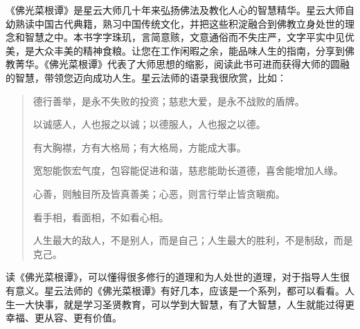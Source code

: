 \begin{book}
    《佛光菜根谭》是星云大师几十年来弘扬佛法及教化人心的智慧精华。星云大师自幼熟读中国古代典籍，熟习中国传统文化，并把这些积淀融合到佛教立身处世的理念和智慧之中。本书字字珠玑，言简意赅，文意通俗而不失庄严，文字平实中见优美，是大众丰美的精神食粮。让您在工作闲暇之余，能品味人生的指南，分享到佛教菁华。《佛光菜根谭》代表了大师思想的缩影，阅读此书可进而获得大师的圆融的智慧，带领您迈向成功人生。星云法师的语录我很欣赏，比如：\begin{quotation}
        德行善举，是永不失败的投资；慈悲大爱，是永不战败的盾牌。

        以诚感人，人也报之以诚；以德服人，人也报之以德。

        有大胸襟，方有大格局；有大格局，方能成大事。

        宽恕能恢宏气度，包容能促进和谐，慈悲能助长道德，喜舍能增加人缘。

        心善，则触目所及皆真善美；心恶，则言行举止皆贪瞋痴。

        看手相，看面相，不如看心相。

        人生最大的敌人，不是别人，而是自己；人生最大的胜利，不是制敌，而是克己。
    \end{quotation} 读《佛光菜根谭》，可以懂得很多修行的道理和为人处世的道理，对于指导人生很有意义。星云法师的《佛光菜根谭》有好几本，应该是一个系列，都可以看看。人生一大快事，就是学习圣贤教育，可以学到大智慧，有了大智慧，人生就能过得更幸福、更从容、更有价值。
\end{book}
